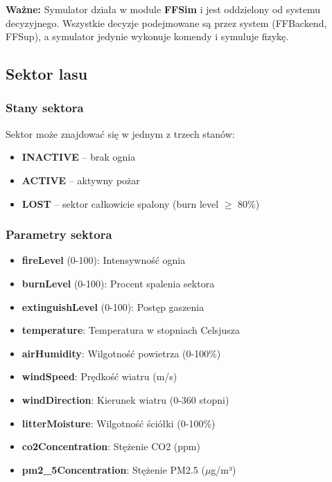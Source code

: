 \documentclass[11pt,a4paper]{article}
\begin{document}
\textbf{Ważne:} Symulator działa w module \textbf{FFSim} i jest oddzielony od systemu decyzyjnego. Wszystkie decyzje podejmowane są przez system (FFBackend, FFSup), a symulator jedynie wykonuje komendy i symuluje fizykę.

\subsection{Sektor lasu}

\subsubsection{Stany sektora}

Sektor może znajdować się w jednym z trzech stanów:
\begin{itemize}
    \item \textbf{INACTIVE} -- brak ognia
    \item \textbf{ACTIVE} -- aktywny pożar
    \item \textbf{LOST} -- sektor całkowicie spalony (burn level $\geq$ 80\%)
\end{itemize}

\subsubsection{Parametry sektora}

\begin{itemize}
    \item \textbf{fireLevel} (0-100): Intensywność ognia
    \item \textbf{burnLevel} (0-100): Procent spalenia sektora
    \item \textbf{extinguishLevel} (0-100): Postęp gaszenia
    \item \textbf{temperature}: Temperatura w stopniach Celsjusza
    \item \textbf{airHumidity}: Wilgotność powietrza (0-100\%)
    \item \textbf{windSpeed}: Prędkość wiatru (m/s)
    \item \textbf{windDirection}: Kierunek wiatru (0-360 stopni)
    \item \textbf{litterMoisture}: Wilgotność ściółki (0-100\%)
    \item \textbf{co2Concentration}: Stężenie CO2 (ppm)
    \item \textbf{pm2\_5Concentration}: Stężenie PM2.5 ($\mu$g/m³)
\end{itemize}
\end{document}
